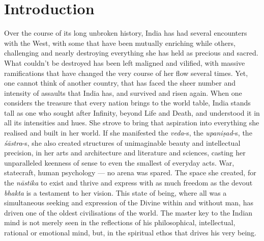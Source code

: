 \section*{Introduction}

Over the course of its long unbroken history, India has had several encounters with the West, with some that have been mutually enriching while others, challenging and nearly destroying everything she has held as precious and sacred. What couldn’t be destroyed has been left maligned and vilified, with massive ramifications that have changed the very course of her flow several times. Yet, one cannot think of another country, that has faced the sheer number and intensity of assaults that India has, and survived and risen again. When one considers the treasure that every nation brings to the world table, India stands tall as one who sought after Infinity, beyond Life and Death, and understood it in all its intensities and hues. She strove to bring that aspiration into everything she realised and built in her world. If she manifested the \textit{veda}-s, the \textit{upaniṣad}-s, the \textit{śāstra}-s, she also created structures of unimaginable beauty and intellectual precision, in her arts and architecture and literature and sciences, casting her unparalleled keenness of sense to even the smallest of everyday acts. War, statecraft, human psychology — no arena was spared. The space she created, for the \textit{nāstika} to exist and thrive and express with as much freedom as the devout \textit{bhakta} is a testament to her vision. This state of being, where all was a simultaneous seeking and expression of the Divine within and without man, has driven one of the oldest civilisations of the world. The master key to the Indian mind is not merely seen in the reflections of his philosophical, intellectual, rational or emotional mind, but, in the spiritual ethos that drives his very being.

